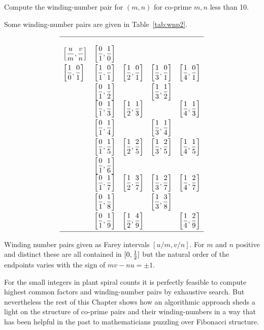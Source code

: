 \begin{jExercise}
	Compute the winding-number pair for $(m,n)$ for co-prime $m,n$ less than 10. 
\end{jExercise}
\begin{jAnswer} 
	\label{ex:wnp}
	Some winding-number pairs are given in Table~\ref{tab:wnp2}.
	\begin{table}
	\begin{equation*}
		\begin{array}{lllll}
			\hline
			\\
			\left[\displaystyle\frac{u}{m},\frac{v}{n}\right]
			&\left[\displaystyle\frac{0}{1},\frac{1}{0}\right]&   &  &   \\[2ex]
			\left[\displaystyle\frac{ 1}{0},\frac{0}{1}\right] &  \left[\displaystyle\frac{1}{1},\frac{0}{1}\right]  &  \left[\displaystyle\frac{1}{2},\frac{0}{1}\right]  & \left[\displaystyle\frac{1}{3},\frac{0}{1}\right]& \left[\displaystyle\frac{1}{4},\frac{0}{1}\right] \\[2ex]
			&  \left[\displaystyle\frac{0}{1},\frac{1}{2}\right]&  & \left[\displaystyle\frac{1}{3},\frac{1}{2}\right] &  \\
			&  \left[\displaystyle\frac{0}{1},\frac{1}{3}\right] & \left[\displaystyle\frac{1}{2},\frac{1}{3}\right] &  & \left[\displaystyle\frac{1}{4},\frac{1}{3}\right] \\[2ex]
			&  \left[\displaystyle\frac{0}{1},\frac{1}{4}\right] &  & \left[\displaystyle\frac{1}{3},\frac{1}{4}\right] & \\[2ex]
			&  \left[\displaystyle\frac{0}{1},\frac{1}{5}\right] &\left[\displaystyle\frac{1}{2},\frac{2}{5}\right] & \left[\displaystyle\frac{1}{3},\frac{2}{5}\right] &\left[\displaystyle\frac{1}{4},\frac{1}{5}\right] \\[2ex]
			&  \left[\displaystyle\frac{0}{1},\frac{1}{6}\right] &  &  &  \\
			&  \left[\displaystyle\frac{0}{1},\frac{1}{7}\right] &\left[\displaystyle\frac{1}{2},\frac{3}{7}\right]& \left[\displaystyle\frac{1}{3},\frac{2}{7}\right] & \left[\displaystyle\frac{1}{4},\frac{2}{7}\right]  \\[2ex]
			&  \left[\displaystyle\frac{0}{1},\frac{1}{8}\right] &  & \left[\displaystyle\frac{1}{3},\frac{3}{8}\right] &  \\[2ex]
			&  \left[\displaystyle\frac{0}{1},\frac{1}{9}\right] & \left[\displaystyle\frac{1}{2},\frac{4}{9}\right] &  & \left[\displaystyle\frac{1}{4},\frac{2}{9}\right]  \\[2ex]
			\hline
		\end{array}
	\end{equation*}
		\caption{Winding number pairs given as Farey intervals $[u/m,v/n]$. For $m$ and $n$ positive and distinct these are all contained in $[0,\textstyle{\frac{1}{2}}]$ but the natural order of the endpoints varies with the sign of $mv-nu=\pm 1$.}
		\label{tab:wnp2}
	\end{table}
	
\end{jAnswer}



For the small integers in plant spiral counts it is perfectly feasible to compute highest common factors and winding-number pairs by exhaustive search. But nevertheless the rest of this Chapter shows how an algorithmic approach sheds a light on the structure of co-prime pairs and their winding-numbers in a way that has been helpful in the past to mathematicians puzzling over Fibonacci structure. 


